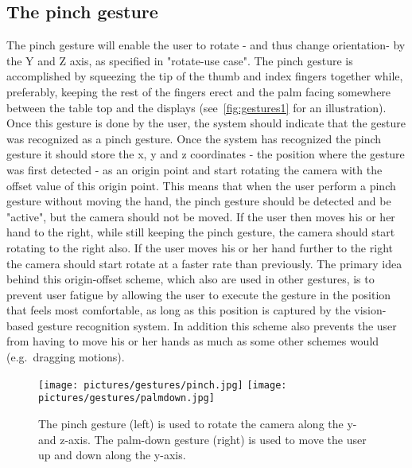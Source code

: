 \subsection{The pinch gesture}
The pinch gesture will enable the user to rotate - and thus change orientation- by the Y and Z axis, as specified in "rotate-use case". 
The pinch gesture is accomplished by squeezing the tip of the thumb and index fingers together while, preferably, keeping the rest of the fingers erect and the palm facing 
somewhere between the table top and the displays (see~\vref{fig:gestures1} for an illustration). Once this gesture is done by the user, 
the system should indicate that the gesture was recognized as a pinch gesture.
Once the system has recognized the pinch gesture it should store the x, y and z coordinates - the position where the gesture was first detected - as an origin point and start rotating the 
camera with the offset value of this origin point. This means that when the user perform a pinch gesture without moving the hand, the pinch gesture should be detected and be
"active", but the camera should not be moved. If the user then moves his or her hand to the right, while still keeping the pinch gesture, the camera should start rotating 
to the right also. If the user moves his or her hand further to the right the camera should start rotate at a faster rate than previously.  
The primary idea behind this origin-offset scheme, which also are used in other gestures, is to prevent user fatigue by allowing the user to execute
the gesture in the position that feels most comfortable, as long as this position is captured by the vision-based gesture recognition system. 
In addition this scheme also prevents the user from having to move his or her hands as much as some other schemes would (e.g.~dragging motions).  

\begin{figure}%
	\texttt{[image: pictures/gestures/pinch.jpg]}
    \texttt{[image: pictures/gestures/palmdown.jpg]}
	\caption[The pinch and palm-down gestures]{The pinch gesture (left) is used to rotate the camera along the y- and z-axis. 
             The palm-down gesture (right) is used to move the user up and down along the y-axis.}
	\label{fig:gestures1}
\end{figure} 

